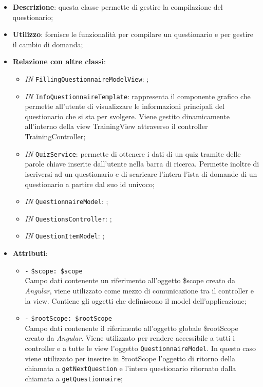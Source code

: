 \begin{itemize}
	\item \textbf{Descrizione}: questa classe permette di gestire la compilazione del questionario;
	\item \textbf{Utilizzo}: fornisce le funzionalità per compilare un questionario e per gestire il cambio di domanda;
	\item \textbf{Relazione con altre classi}:
	\begin{itemize}
		\item \textit{IN} \texttt{FillingQuestionnaireModelView}: ;  
		\item \textit{IN} \texttt{InfoQuestionnaireTemplate}: rappresenta il componente grafico che permette all'utente di visualizzare le informazioni principali del questionario che si sta per svolgere. Viene gestito dinamicamente all'interno della view TrainingView attraverso il controller TrainingController;
		\item \textit{IN} \texttt{QuizService}: permette di ottenere i dati di un quiz tramite delle parole chiave inserite dall'utente nella barra di ricerca. Permette inoltre di iscriversi ad un questionario e di scaricare l'intera l'ista di domande di un questionario a partire dal suo id univoco;
		\item \textit{IN} \texttt{QuestionnaireModel}: ;
		\item \textit{IN} \texttt{QuestionsController}: ; 
		\item \textit{IN} \texttt{QuestionItemModel}: ;
	\end{itemize}
	\item \textbf{Attributi}:
	\begin{itemize}
		\item \texttt{-} \texttt{\$scope: \$scope} \\
		Campo dati contenente un riferimento all’oggetto \$scope creato da \textit{Angular}, viene utilizzato come mezzo di comunicazione tra il controller e la view. Contiene gli oggetti che definiscono il model dell’applicazione;
		\item \texttt{-} \texttt{\$rootScope: \$rootScope} \\
		Campo dati contenente il riferimento all'oggetto globale \$rootScope creato da \textit{Angular}. Viene utilizzato per rendere accessibile a tutti i controller e a tutte le view l'oggetto \texttt{QuestionnaireModel}. In questo caso viene utilizzato per inserire in \$rootScope l'oggetto di ritorno della chiamata a \texttt{getNextQuestion} e l'intero questionario ritornato dalla chiamata a \texttt{getQuestionnaire};

\end{itemize}
\end{itemize}
